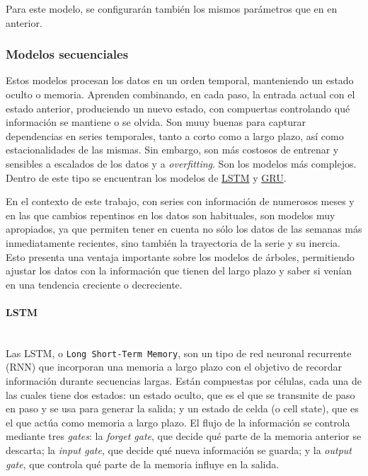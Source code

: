 \documentclass[a4paper,onecolumn]{extarticle}
\begin{document}
\begin{sloppypar}
Para este modelo, se configurarán también los mismos parámetros que en en anterior.

\subsubsection{Modelos secuenciales}
Estos modelos procesan los datos en un orden temporal, manteniendo un estado oculto o memoria. Aprenden combinando, en cada paso, la entrada actual con el estado anterior, 
produciendo un nuevo estado, con compuertas controlando qué información se mantiene o se olvida. Son muuy buenas para capturar dependencias en series temporales, tanto a corto 
como a largo plazo, así como estacionalidades de las mismas. Sin embargo, son más costosos de entrenar y sensibles a escalados de los datos y a \textit{overfitting}. Son los 
modelos más complejos. Dentro de este tipo se encuentran los modelos de \hyperref[LSTM]{LSTM} y \hyperref[GRU]{GRU}.

En el contexto de este trabajo, con series con información de numerosos meses y en las que cambios repentinos en los datos son habituales, son modelos muy apropiados, ya que 
permiten tener en cuenta no sólo los datos de las semanas más inmediatamente recientes, sino también la trayectoria de la serie y su inercia. Esto presenta una ventaja importante 
sobre los modelos de árboles, permitiendo ajustar los datos con la información que tienen del largo plazo y saber si venían en una tendencia creciente o decreciente.

\paragraph{LSTM} \label{LSTM}\mbox{} \\
Las LSTM, o \texttt{Long Short-Term Memory}, son un tipo de red neuronal recurrente (RNN) que incorporan una memoria a largo plazo con el objetivo de recordar información durante 
secuencias largas. Están compuestas por células, cada una de las cuales tiene dos estados: un estado oculto, que es el que se transmite de paso en paso y se usa para generar la 
salida; y un estado de celda (o cell state), que es el que actúa como memoria a largo plazo. El flujo de la información se controla mediante tres \textit{gates}: la \textit{forget 
gate}, que decide qué parte de la memoria anterior se descarta; la \textit{input gate}, que decide qué nueva información se guarda; y la \textit{output gate}, que controla qué 
parte de la memoria influye en la salida.


\end{sloppypar}
\end{document}

